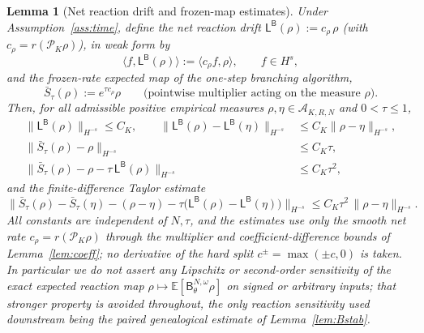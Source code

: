 \documentclass[a4paper,fleqn]{cas-sc}
\newtheorem{lemma}[theorem]{Lemma}
\theoremstyle{definition}
\theoremstyle{remark}
\begin{document}
\begin{lemma}[Net reaction drift and frozen-map estimates]\label{lem:sens}
Under Assumption~\ref{ass:time}, define the \emph{net reaction drift}
$\mathsf L^{\mathsf B}(\rho):=c_\rho\,\rho$ (with $c_\rho=r(\mathcal P_K\rho)$),
in weak form by
\[
\langle f,\mathsf L^{\mathsf B}(\rho)\rangle:=\langle c_\rho f,\rho\rangle,
\qquad f\in H^s,
\]
and the \emph{frozen-rate expected map} of the one-step branching algorithm,
\[
\bar S_\tau(\rho):=e^{\tau c_\rho}\rho
\qquad\text{(pointwise multiplier acting on the measure }\rho).
\]
Then, for all admissible positive empirical measures
$\rho,\eta\in\mathcal A_{K,R,N}$ and $0<\tau\le1$,
\begin{align}
\|\mathsf L^{\mathsf B}(\rho)\|_{H^{-s}}\le C_K,
\qquad
\|\mathsf L^{\mathsf B}(\rho)-\mathsf L^{\mathsf B}(\eta)\|_{H^{-s}}
&\le C_K\|\rho-\eta\|_{H^{-s}},
\label{eq:LB-lip}\\
\|\bar S_\tau(\rho)-\rho\|_{H^{-s}}&\le C_K\tau,
\label{eq:Sbar-0}\\
\|\bar S_\tau(\rho)-\rho-\tau\,\mathsf L^{\mathsf B}(\rho)\|_{H^{-s}}&\le C_K\tau^2,
\label{eq:Sbar-1}
\end{align}
and the finite-difference Taylor estimate
\begin{equation}\label{eq:Sbar-taylor}
\bigl\|\bar S_\tau(\rho)-\bar S_\tau(\eta)-(\rho-\eta)
-\tau\bigl(\mathsf L^{\mathsf B}(\rho)-\mathsf L^{\mathsf B}(\eta)\bigr)\bigr\|_{H^{-s}}
\le C_K\tau^2\,\|\rho-\eta\|_{H^{-s}}.
\end{equation}
All constants are independent of $N,\tau$, and the estimates use only the smooth net
rate $c_\rho=r(\mathcal P_K\rho)$ through the multiplier and
coefficient-difference bounds of Lemma~\ref{lem:coeff}; \emph{no} derivative of the
hard split $c^\pm=\max(\pm c,0)$ is taken. In particular we do \emph{not} assert any
Lipschitz or second-order sensitivity of the \emph{exact} expected reaction map
$\rho\mapsto\mathbb E[\mathsf B^{N,\omega}_\theta\rho]$ on signed or arbitrary inputs;
that stronger property is avoided throughout, the only reaction sensitivity used
downstream being the paired genealogical estimate of Lemma~\ref{lem:Bstab}.
\end{lemma}
\end{document}
